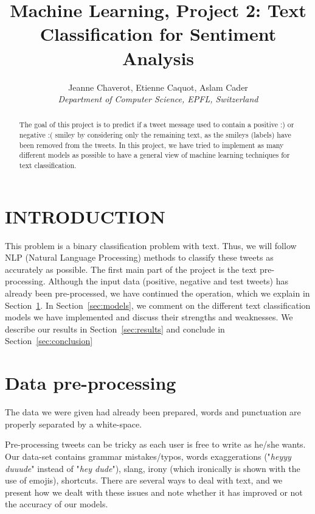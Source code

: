 \documentclass[letterpaper, 10 pt, conference]{ieeeconf}  %
\title{\LARGE \bf
Machine Learning, Project 2: Text Classification for Sentiment Analysis}
\author{
  Jeanne Chaverot, Etienne Caquot, Aslam Cader \\
  \textit{Department of Computer Science, EPFL, Switzerland}
}
\begin{document}
\maketitle
\thispagestyle{empty}
\pagestyle{empty}


\begin{abstract}

The goal of this project is to predict if a tweet message used to contain a positive :) or negative :( smiley by considering only the remaining text, as the smileys (labels) have been removed from the tweets. In this project, we have tried to implement as many different models as possible to have a general view of machine learning techniques for text classification.

\end{abstract}


\section*{INTRODUCTION}

This problem is a binary classification problem with text. Thus, we will follow NLP (Natural Language Processing) methods to classify these tweets as accurately as possible.
The first main part of the project is the text pre-processing. Although the input data (positive, negative and test tweets) has already been pre-processed, we have continued the operation, which we explain in Section~\ref{sec:preprocess}. 
In Section~\ref{sec:models}, we comment on the different text classification models we have implemented and discuss their strengths and weaknesses. 
We describe our results in Section~\ref{sec:results} and conclude in Section~\ref{sec:conclusion}

\section{Data pre-processing}
\label{sec:preprocess}

The data we were given had already been prepared, words and punctuation are properly separated by a white-space.

Pre-processing tweets can be tricky as each user is free to write as he/she wants. Our data-set contains grammar mistakes/typos, words exaggerations ("\textit{heyyy duuude}" instead of "\textit{hey dude}"), slang, irony (which ironically is shown with the use of emojis), shortcuts. 
There are several ways to deal with text, and we present how we dealt with these issues and note whether it has improved or not the accuracy of our models.
\end{document}
